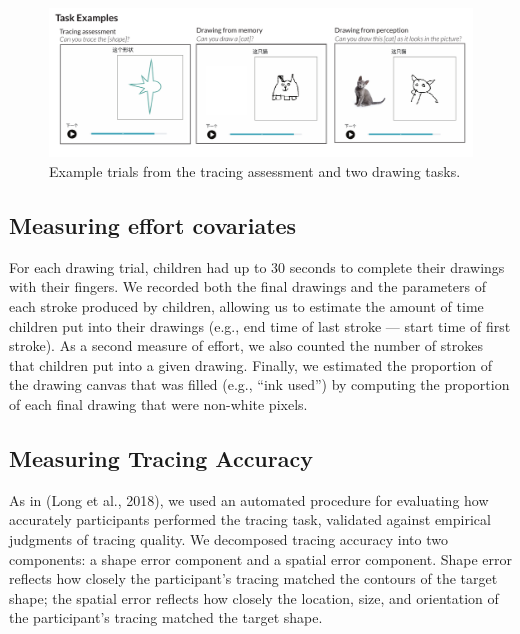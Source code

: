 \documentclass[
  english,
  man]{apa6}
\begin{document}
\begin{figure}[H]
\includegraphics[width=1\linewidth]{figs/task_examples} \caption{Example trials from the tracing assessment and two drawing tasks.}\label{fig:example-tasks}
\end{figure}

\hypertarget{measuring-effort-covariates}{%
\subsection{Measuring effort covariates}\label{measuring-effort-covariates}}

For each drawing trial, children had up to 30 seconds to complete their drawings with their fingers. We recorded both the final drawings and the parameters of each stroke produced by children, allowing us to estimate the amount of time children put into their drawings (e.g., end time of last stroke --- start time of first stroke). As a second measure of effort, we also counted the number of strokes that children put into a given drawing. Finally, we estimated the proportion of the drawing canvas that was filled (e.g., \enquote{ink used}) by computing the proportion of each final drawing that were non-white pixels.

\hypertarget{measuring-tracing-accuracy}{%
\subsection{Measuring Tracing Accuracy}\label{measuring-tracing-accuracy}}

As in (Long et al., 2018), we used an automated procedure for evaluating how accurately participants performed the tracing task, validated against empirical judgments of tracing quality. We decomposed tracing accuracy into two components: a shape error component and a spatial error component. Shape error reflects how closely the participant's tracing matched the contours of the target shape; the spatial error reflects how closely the location, size, and orientation of the participant's tracing matched the target shape.
\end{document}
